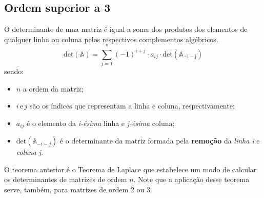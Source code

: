\subsection{Ordem superior a 3}
\begin{theorem}
	O determinante de uma matriz é igual a soma dos produtos dos elementos de qualquer linha ou coluna pelos respectivos complementos algébricos.
$$
\mathrm{det(\mathbb{A})}=\sum_{j=1}^{^{n}}(-1)^{i+j}\cdot a_{ij}\cdot\mathrm{det(\mathbb{A}_{-i-j})}
$$
sendo:
\begin{itemize}
	\item $n$ a ordem da matriz;
	\item $i\,\mathrm{e}\,j$ são os índices que representam a linha e coluna,
	respectivamente;
	\item $a_{ij}$ é o elemento da \textit{i-ésima} linha e \textit{j-ésima}
	coluna;
	\item $\mathrm{det}(\mathbb{A}_{-i-j})$ é o determinante da matriz formada
	pela \textbf{remoção} da \textit{linha i} e \textit{coluna j}.
\end{itemize}
\end{theorem}

O teorema anterior é o Teorema de Laplace que estabelece um modo de calcular os determinantes de matrizes de ordem $n$. Note que a aplicação
desse teorema serve, também, para matrizes de ordem 2 ou 3.


